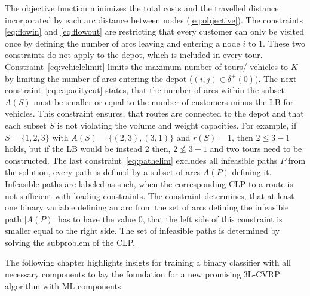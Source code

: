The objective function minimizes the total costs and the travelled distance incorporated
by each arc distance between nodes (\ref{eq:objective}). The constraints \ref{eq:flowin}
and \ref{eq:flowout} are restricting that every customer can only be visited once by defining the number
of arcs leaving and entering a node $i$ to 1. These two constraints do not apply to the depot,
which is included in every tour. Constraint~\ref{eq:vehiclelimit} limits the maximum number of
tours/ vehicles to $K$ by limiting the number of arcs entering the depot ($(i,j)\in \delta^+(0)$).
The next constraint~\ref{eq:capacitycut} states, that the number of arcs within the subset $A(S)$
must be smaller or equal to the number of customers minus the \gls{LB} for vehicles. This constraint
ensures, that routes are connected to the depot and that each subset $S$ is not violating
the volume and weight capacities. For example, if $S=\{1,2,3\}$ with $A(S)=\{(2,3),(3,1)\}$
and $r(S) = 1$, then $2 \leq 3 - 1$ holds, but if the \gls{LB} would be instead 2 then, $2 \not\leq 3 - 1$
and two tours need to be constructed. The last constraint~\ref{eq:pathelim} excludes all infeasible paths
$P$ from the solution, every path is defined by a subset of arcs $A(P)$ defining it. Infeasible
paths are labeled as such, when the corresponding \gls{CLP} to a route is not sufficient with loading
constraints. The constraint determines, that at least one binary variable defining an arc
from the set of arcs defining the infeasible path $|A(P)|$ has to have the value 0, that the left
side of this constraint is smaller equal to the right side. The set of infeasible paths is determined by
solving the subproblem of the \gls{CLP}.

The following chapter highlights insigts for training a binary classifier with all necessary components
to lay the foundation for a new promising \gls{3L-CVRP} algorithm with \gls{ML} components.




